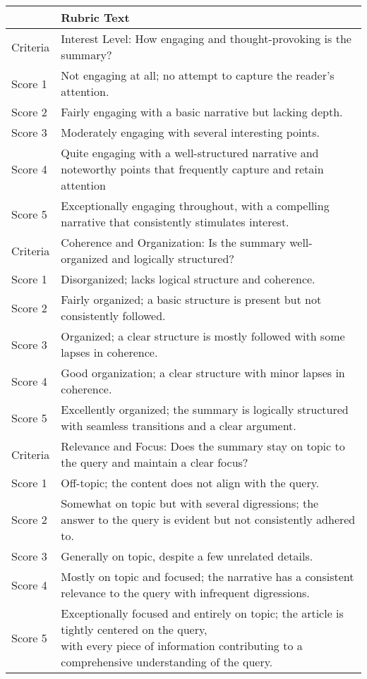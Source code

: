 \begin{table*}[]
\small 
\centering
\begin{tabular}{@{}ll@{}}
\toprule
 & Rubric Text \\ \midrule
Criteria & Interest Level: How engaging and thought-provoking is the summary? \\
Score 1 & Not engaging at all; no attempt to capture the reader’s attention. \\
Score 2 & Fairly engaging with a basic narrative but lacking depth. \\
Score 3 & Moderately engaging with several interesting points. \\
Score 4 & Quite engaging with a well-structured narrative and noteworthy points that frequently capture and retain attention \\
Score 5 & Exceptionally engaging throughout, with a compelling narrative that consistently stimulates interest. \\ \midrule
Criteria & Coherence and Organization: Is the summary well-organized and logically structured? \\
Score 1 & Disorganized; lacks logical structure and coherence. \\
Score 2 & Fairly organized; a basic structure is present but not consistently followed. \\
Score 3 & Organized; a clear structure is mostly followed with some lapses in coherence. \\
Score 4 & Good organization; a clear structure with minor lapses in coherence. \\
Score 5 & Excellently organized; the summary is logically structured with seamless transitions and a clear argument. \\ \midrule
Criteria & Relevance and Focus: Does the summary stay on topic to the query and maintain a clear focus? \\
Score 1 & Off-topic; the content does not align with the query. \\
Score 2 & Somewhat on topic but with several digressions; the answer to the query is evident but not consistently adhered to. \\
Score 3 & Generally on topic, despite a few unrelated details. \\
Score 4 & Mostly on topic and focused; the narrative has a consistent relevance to the query with infrequent digressions. \\
Score 5 & \specialcellleft{Exceptionally focused and entirely on topic; the article is tightly centered on the query,\\with every piece of information contributing to a comprehensive understanding of the query.} \\ \midrule

\end{tabular}
\end{table*}
